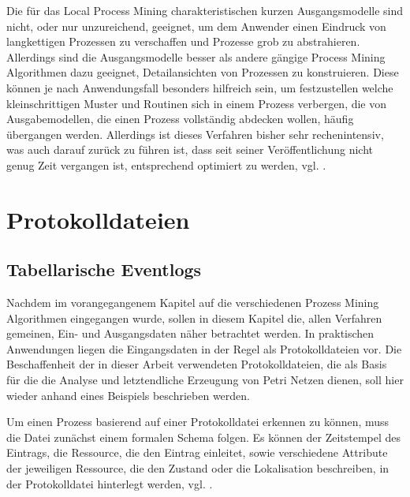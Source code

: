 Die für das Local Process Mining charakteristischen kurzen Ausgangsmodelle sind nicht, oder nur unzureichend, geeignet, um dem Anwender einen Eindruck von langkettigen Prozessen zu verschaffen und Prozesse grob zu abstrahieren. Allerdings sind die Ausgangsmodelle besser als andere gängige Process Mining Algorithmen dazu geeignet, Detailansichten von Prozessen zu konstruieren. 
Diese können je nach Anwendungsfall besonders hilfreich sein, um festzustellen welche kleinschrittigen Muster und Routinen sich in einem Prozess verbergen, die von Ausgabemodellen, die einen Prozess vollständig abdecken wollen, häufig übergangen werden. Allerdings ist dieses Verfahren bisher sehr rechenintensiv, was auch darauf zurück zu führen ist, dass seit seiner Veröffentlichung nicht genug Zeit vergangen ist, entsprechend optimiert zu werden, vgl. \cite{localMining}.


\section{Protokolldateien}
\subsection{Tabellarische Eventlogs}
Nachdem im vorangegangenem Kapitel auf die verschiedenen Prozess Mining Algorithmen eingegangen wurde, sollen in diesem Kapitel die, allen Verfahren gemeinen, Ein- und Ausgangsdaten näher betrachtet werden.
In praktischen Anwendungen liegen die Eingangsdaten in der Regel als Protokolldateien vor. Die Beschaffenheit der in dieser Arbeit verwendeten  Protokolldateien, die als Basis für die die Analyse und letztendliche Erzeugung von Petri Netzen dienen, soll hier wieder anhand eines Beispiels beschrieben werden.

Um einen Prozess basierend auf einer Protokolldatei erkennen zu können, muss die Datei zunächst einem formalen Schema folgen. Es können der Zeitstempel des Eintrags, die Ressource, die den Eintrag einleitet, sowie verschiedene Attribute der jeweiligen Ressource, die den Zustand oder die Lokalisation beschreiben, in der Protokolldatei hinterlegt werden, vgl. \cite{PMinAction}.

